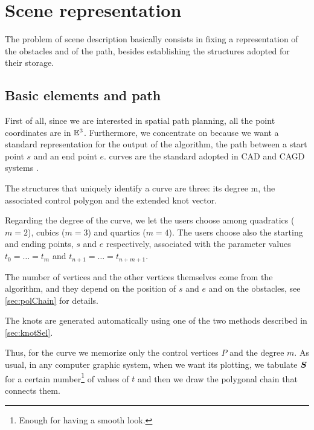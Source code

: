 \documentclass[dissertation.tex]{subfiles}
\begin{document}
\chapter{Scene representation}\label{cha:scene}
The problem of scene description basically consists in fixing a
representation of the obstacles and of the path, besides establishing the structures adopted for their storage.

\section{Basic elements and path}
First of all, since we are interested in spatial path planning, all
the point coordinates are in $\mathbb{E}^3$. Furthermore, we concentrate
on \bss because we want a standard representation for the output of
the algorithm, the path between a start point $s$ and an end point
$e$. \bs
curves are the standard adopted in \ac{CAD} and
\ac{CAGD} systems \cite{hughes}\cite{foley}. 

The structures that uniquely identify a \bs curve are
three: its degree m, the associated control polygon and the extended
knot vector.

Regarding the degree of the curve, we let 
the users choose among quadratics
($m=2$), cubics ($m=3$) and quartics ($m=4$). The users
choose also the starting and ending points, $s$ and $e$ respectively,
associated with the parameter values $t_0=\dots=t_m$ and
$t_{n+1}=\dots=t_{n+m+1}$.

The number
of vertices and the other vertices themselves come from the algorithm,
and they depend on the position of $s$ and $e$ and on the obstacles, see
\cref{sec:polChain} for details.

The knots are generated automatically using one of the two methods
described in \cref{sec:knotSel}.

Thus, for the curve we memorize only the control vertices $P$ and the
degree 
$m$. As usual, in any computer graphic system, when we want its plotting, we tabulate $\boldsymbol{S}$ for a certain
number\footnote{Enough for having a smooth look.} of values of $t$ and
then we draw the polygonal chain that connects them.
\end{document}
